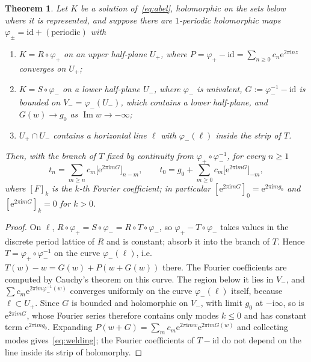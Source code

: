 \documentclass[11pt]{amsart}
\newtheorem{theorem}{Theorem}[section]
\theoremstyle{definition}
\newcommand{\Rr}{R}
\newcommand{\Kk}{K}
\newcommand{\eee}{\mathrm{e}}
\newcommand{\ii}{\mathrm{i}}
\begin{document}
\begin{theorem}\label{thm:welding}
Let $\Kk$ be a solution of~\eqref{eq:abel}, holomorphic on the sets below
where it is represented, and suppose there are
$1$-periodic holomorphic maps $\varphi_\pm=\mathrm{id}+(\text{periodic})$ with
\begin{enumerate}
\item $\Kk=\Rr\circ\varphi_+$ on an upper half-plane $U_+$, where
  $P=\varphi_+-\mathrm{id}=\sum_{n\ge0}c_n\eee^{2\pi\ii nz}$ converges on $U_+$;
\item $\Kk=S\circ\varphi_-$ on a lower half-plane $U_-$, where $\varphi_-$ is
  univalent, $G:=\varphi_-^{-1}-\mathrm{id}$ is bounded on
  $V_-=\varphi_-(U_-)$, which contains a lower half-plane, and
  $G(w)\to g_0$ as $\operatorname{Im}w\to-\infty$;
\item $U_+\cap U_-$ contains a horizontal line $\ell$ with $\varphi_-(\ell)$
  inside the strip of $T$.
\end{enumerate}
Then, with the branch of $T$ fixed by continuity from $\varphi_+\circ\varphi_-^{-1}$,
for every $n\ge1$
\begin{equation}\label{eq:welding}
 t_n=\sum_{m\ge n}c_m\bigl[\eee^{2\pi\ii mG}\bigr]_{n-m},\qquad
 t_0=g_0+\sum_{m\ge0}c_m\bigl[\eee^{2\pi\ii mG}\bigr]_{-m},
\end{equation}
where $[F]_k$ is the $k$-th Fourier coefficient; in particular
$[\eee^{2\pi\ii mG}]_0=\eee^{2\pi\ii mg_0}$ and $[\eee^{2\pi\ii mG}]_k=0$ for $k>0$.
\end{theorem}

\begin{proof}
On $\ell$, $\Rr\circ\varphi_+=S\circ\varphi_-=\Rr\circ T\circ\varphi_-$, so
$\varphi_+-T\circ\varphi_-$ takes values in the discrete period lattice of
$\Rr$ and is constant; absorb it into the branch of $T$.  Hence
$T=\varphi_+\circ\varphi_-^{-1}$ on the curve $\varphi_-(\ell)$, i.e.\
$T(w)-w=G(w)+P(w+G(w))$ there.  The Fourier coefficients are computed by
Cauchy's theorem on this curve.  The region below it lies in $V_-$, and
$\sum c_m\eee^{2\pi\ii m\varphi_-^{-1}(w)}$ converges uniformly on the curve
$\varphi_-(\ell)$ itself, because $\ell\subset U_+$.  Since $G$ is bounded and holomorphic on $V_-$, with
limit $g_0$ at $-\ii\infty$, so is $\eee^{2\pi\ii mG}$, whose Fourier series
therefore contains only modes $k\le0$ and has constant term
$\eee^{2\pi\ii mg_0}$.  Expanding
$P(w+G)=\sum_mc_m\eee^{2\pi\ii mw}\eee^{2\pi\ii mG(w)}$ and collecting modes
gives~\eqref{eq:welding}; the Fourier coefficients of $T-\mathrm{id}$ do not depend
on the line inside its strip of holomorphy.
\end{proof}
\end{document}
